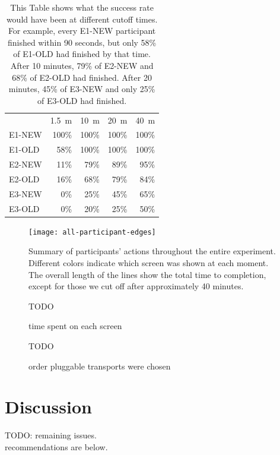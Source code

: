 \documentclass[USenglish,oneside,twocolumn]{article}
\begin{document}
\begin{table}
\centering 
	\begin{tabular}{l r r r r}
	& \multicolumn{1}{c}{1.5~m} & \multicolumn{1}{c}{10~m} & \multicolumn{1}{c}{20~m} & \multicolumn{1}{c}{40~m} \\
	\noalign{\hrule}
	E1-NEW & 100\% & 100\% & 100\% & 100\% \\
	E1-OLD & 58\% & 100\% & 100\% & 100\% \\
	E2-NEW & 11\% & 79\% & 89\% & 95\% \\
	E2-OLD & 16\% & 68\% & 79\% & 84\% \\
	E3-NEW & 0\% & 25\% & 45\% & 65\% \\
	E3-OLD & 0\% & 20\% & 25\% & 50\% \\
	\end{tabular}
\caption{This Table shows what the success rate would have been
at different cutoff times.
For example, every E1-NEW participant finished within 90 seconds,
but only 58\% of E1-OLD had finished by that time.
After 10 minutes, 79\% of E2-NEW and 68\% of E2-OLD had finished.
After 20 minutes, 45\% of E3-NEW and only 25\% of E3-OLD had finished.}
\end{table}

\begin{figure}
\centering
\texttt{[image: all-participant-edges]}
\caption{
Summary of participants' actions throughout the entire experiment.
Different colors indicate which screen was shown at each moment.
The overall length of the lines show the total time to completion,
except for those we cut off after approximately 40 minutes.
}
\label{fig:all-participant-edges}
\end{figure}

\begin{figure} 
{\color {red} TODO} 
\caption{time spent on each screen}
\end{figure} 

\begin{figure} 
{\color {red} TODO} 
\caption{order pluggable transports were chosen}
\end{figure} 

\section{Discussion} 
{\color {red} TODO: remaining issues.} \\
{\color {red} recommendations are below.} \\
\end{document}
